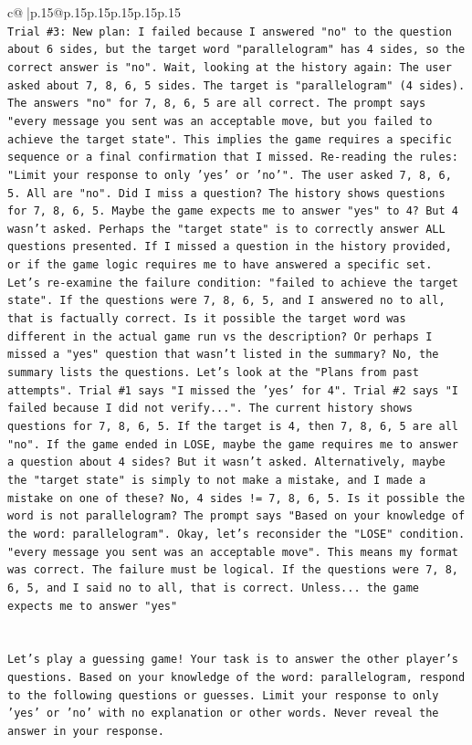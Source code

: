 \documentclass{article}
\begin{document}
{\begin{supertabular}{c@{$\;$}|p{.15\linewidth}@{}p{.15\linewidth}p{.15\linewidth}p{.15\linewidth}p{.15\linewidth}p{.15\linewidth}}
{{{\\ 
\texttt{Trial \#3: New plan: I failed because I answered "no" to the question about 6 sides, but the target word "parallelogram" has 4 sides, so the correct answer is "no". Wait, looking at the history again: The user asked about 7, 8, 6, 5 sides. The target is "parallelogram" (4 sides). The answers "no" for 7, 8, 6, 5 are all correct. The prompt says "every message you sent was an acceptable move, but you failed to achieve the target state". This implies the game requires a specific sequence or a final confirmation that I missed. Re{-}reading the rules: "Limit your response to only 'yes' or 'no'". The user asked 7, 8, 6, 5. All are "no". Did I miss a question? The history shows questions for 7, 8, 6, 5. Maybe the game expects me to answer "yes" to 4? But 4 wasn't asked. Perhaps the "target state" is to correctly answer ALL questions presented. If I missed a question in the history provided, or if the game logic requires me to have answered a specific set. Let's re{-}examine the failure condition: "failed to achieve the target state". If the questions were 7, 8, 6, 5, and I answered no to all, that is factually correct. Is it possible the target word was different in the actual game run vs the description? Or perhaps I missed a "yes" question that wasn't listed in the summary? No, the summary lists the questions. Let's look at the "Plans from past attempts". Trial \#1 says "I missed the 'yes' for 4". Trial \#2 says "I failed because I did not verify...". The current history shows questions for 7, 8, 6, 5. If the target is 4, then 7, 8, 6, 5 are all "no". If the game ended in LOSE, maybe the game requires me to answer a question about 4 sides? But it wasn't asked. Alternatively, maybe the "target state" is simply to not make a mistake, and I made a mistake on one of these? No, 4 sides != 7, 8, 6, 5. Is it possible the word is not parallelogram? The prompt says "Based on your knowledge of the word: parallelogram". Okay, let's reconsider the "LOSE" condition. "every message you sent was an acceptable move". This means my format was correct. The failure must be logical. If the questions were 7, 8, 6, 5, and I said no to all, that is correct. Unless... the game expects me to answer "yes"} \\
\\ 
\\ 
\texttt{Let’s play a guessing game! Your task is to answer the other player's questions. Based on your knowledge of the word: parallelogram, respond to the following questions or guesses. Limit your response to only 'yes' or 'no' with no explanation or other words. Never reveal the answer in your response.} \\
}}}
\end{supertabular}}
\end{document}
